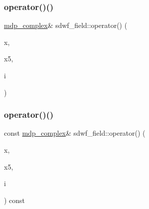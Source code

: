 \mbox{\label{classsdwf__field_a1cd68e8911b77c60ecd6a1cd245ec047}} 
\subsubsection{\texorpdfstring{operator()()}{operator()()}\hspace{0.1cm}{\footnotesize\ttfamily [2/3]}}
{\footnotesize\ttfamily \hyperlink{classmdp__complex}{mdp\+\_\+complex}\& sdwf\+\_\+field\+::operator() (\begin{DoxyParamCaption}\item[{\hyperlink{mdp__compatibility__macros_8h_aa6f1179c424e48adef1cedf7c436eb75}{site}}]{x,  }\item[{int}]{x5,  }\item[{int}]{i }\end{DoxyParamCaption})\hspace{0.3cm}{\ttfamily [inline]}}

\mbox{\label{classsdwf__field_a47117ef7a81d02150a5f38c8b0a4aaaa}} 
\subsubsection{\texorpdfstring{operator()()}{operator()()}\hspace{0.1cm}{\footnotesize\ttfamily [3/3]}}
{\footnotesize\ttfamily const \hyperlink{classmdp__complex}{mdp\+\_\+complex}\& sdwf\+\_\+field\+::operator() (\begin{DoxyParamCaption}\item[{\hyperlink{mdp__compatibility__macros_8h_aa6f1179c424e48adef1cedf7c436eb75}{site}}]{x,  }\item[{int}]{x5,  }\item[{int}]{i }\end{DoxyParamCaption}) const\hspace{0.3cm}{\ttfamily [inline]}}

\mbox{\label{classsdwf__field_ac9bbccf6442b9f1a1a07b18fd2fe442c}} 
